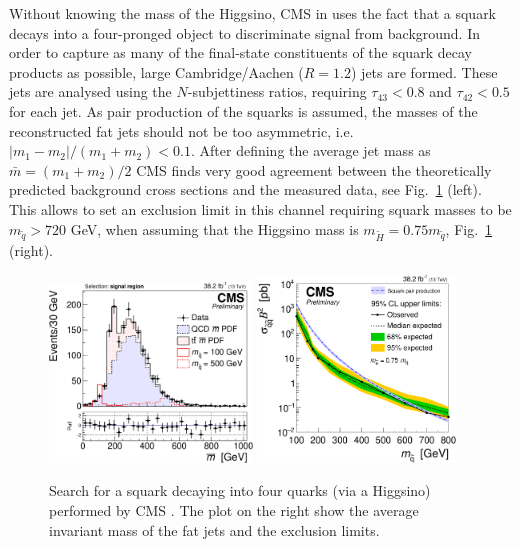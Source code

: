 Without knowing the mass of the Higgsino, CMS in \cite{CMS:2018sek} uses the fact that a squark decays into a four-pronged object to discriminate signal from background. In order to capture as many of the final-state constituents of the squark decay products as possible, large Cambridge/Aachen ($R=1.2$) jets are formed. These jets are analysed using the $N$-subjettiness ratios, requiring $\tau_{43}<0.8$ and $\tau_{42}<0.5$ for each jet. As pair production of the squarks is assumed, the masses of the reconstructed fat jets should not be too asymmetric, i.e. $|m_1 - m_2| / (m_1+m_2) < 0.1$. After defining the average jet mass as $\bar{m} = (m_1+m_2)/2$ CMS finds very good agreement between the theoretically predicted background cross sections and the measured data, see Fig.~\ref{fig:X_search} (left). This allows to set an exclusion limit in this channel requiring squark masses to be $m_{\tilde{q}}  > 720$ GeV, when assuming that the Higgsino mass is $m_{\tilde{H}} = 0.75 m_{\tilde{q}}$, Fig.~\ref{fig:X_search} (right).


\begin{figure}
  \includegraphics[width=0.48\textwidth]{figures/CMS_search_signal.pdf} \hfill
  \includegraphics[width=0.47\textwidth]{figures/CMS_search_exlcusion.pdf} 
  \caption{Search for a squark decaying into four quarks (via a Higgsino) performed by CMS \cite{CMS:2018sek}. The plot on the right show the average invariant mass of the fat jets and the exclusion limits.}\label{fig:X_search}
\end{figure}


